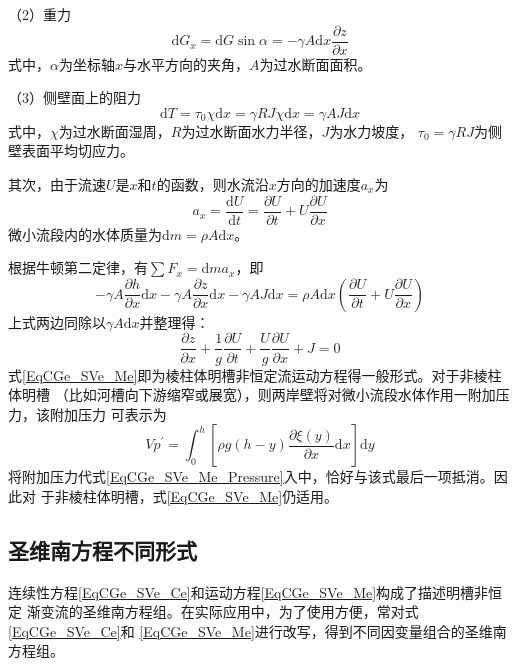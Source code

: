 （2）重力
\begin{equation}
  \mathrm{d}G_{x}
  =
  \mathrm{d}G\sin\alpha
  =
  -\gamma A\mathrm{d}x\frac{\partial z}{\partial x}
\end{equation}
式中，$\alpha$为坐标轴$x$与水平方向的夹角，$A$为过水断面面积。

（3）侧壁面上的阻力
\begin{equation}
\mathrm{d}T
=
\tau_{0}\chi\mathrm{d}x
=
\gamma RJ\chi\mathrm{d}x
=
\gamma AJ\mathrm{d}x
\end{equation}
式中，$\chi$为过水断面湿周，$R$为过水断面水力半径，$J$为水力坡度，
$\tau_{0}=\gamma RJ$为侧壁表面平均切应力。

其次，由于流速$U$是$x$和$t$的函数，则水流沿$x$方向的加速度$a_{x}$为
\begin{equation}
  a_{x}
=
\frac{\mathrm{d} U}{\mathrm{d} t}
=
\frac{\partial U}{\partial t}
+
U
\frac{\partial U}{\partial x}
\end{equation}
微小流段内的水体质量为$\mathrm{d}m=\rho A\mathrm{d}x$。

根据牛顿第二定律，有$\sum F_{x}=\mathrm{d}ma_{x}$，即
\begin{equation}
-\gamma A\frac{\partial h}{\partial x}\mathrm{d}x
-\gamma A\frac{\partial z}{\partial x}\mathrm{d}x
-\gamma AJ\mathrm{d}x
=
\rho A\mathrm{d}x
\left(
\frac{\partial U}{\partial t}
+
U
\frac{\partial U}{\partial x}
\right)
\end{equation}
上式两边同除以$\gamma A\mathrm{d}x$并整理得：
\begin{equation}
\frac{\partial z}{\partial x}
+
\frac{1}{g}
\frac{\partial U}{\partial t}
+
\frac{U}{g}
\frac{\partial U}{\partial x}
+
J
=
0
\label{EqCGe_SVe_Me}
\end{equation}
式\eqref{EqCGe_SVe_Me}即为棱柱体明槽非恒定流运动方程得一般形式。对于非棱柱体明槽
（比如河槽向下游缩窄或展宽），则两岸壁将对微小流段水体作用一附加压力，该附加压力
可表示为
\begin{equation}
  Vp^{\prime}
  =
  \int_{0}^{h}\!
  \left[
    \rho g(h-y)
    \frac{\partial \xi(y)}{\partial x}
    \mathrm{d}x
  \right]
  \mathrm{d}y
\end{equation}
将附加压力代式\eqref{EqCGe_SVe_Me_Pressure}入中，恰好与该式最后一项抵消。因此对
于非棱柱体明槽，式\eqref{EqCGe_SVe_Me}仍适用。

\subsection{圣维南方程不同形式}
连续性方程\eqref{EqCGe_SVe_Ce}和运动方程\eqref{EqCGe_SVe_Me}构成了描述明槽非恒定
渐变流的圣维南方程组。在实际应用中，为了使用方便，常对式\eqref{EqCGe_SVe_Ce}和
\eqref{EqCGe_SVe_Me}进行改写，得到不同因变量组合的圣维南方程组。

